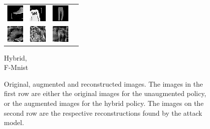 \begin{figure}[h]
\begin{subtable}{.25\linewidth}
    \end{subtable}%
    \hfill
    \begin{subtable}{.25\linewidth}
        \centering
        {\begin{tabular}{ l l l l }
             \includegraphics[width = 24pt]{repimages_fmnist/ori_1_hybrid.jpg} & \includegraphics[width = 24pt]{repimages_fmnist/ori_2_hybrid.jpg}  & \includegraphics[width = 24pt]{repimages_fmnist/ori_3_hybrid.jpg} \\
             \includegraphics[width = 24pt]{repimages_fmnist/rec_1_hybrid.jpg} & \includegraphics[width = 24pt]{repimages_fmnist/rec_2_hybrid.jpg}  & \includegraphics[width = 24pt]{repimages_fmnist/rec_3_hybrid.jpg}  &   \\
        \end{tabular}}
        \caption{Hybrid, \\ F-Mnist}%
    \end{subtable}%
    \caption{ Original, augmented and reconstructed images. The images in the first row are either the original images for the unaugmented policy, or the augmented images for the hybrid policy. The images on the second row are the respective reconstructions found by the attack model.}
    \label{fig:imgs}
\end{figure}
\endgroup


